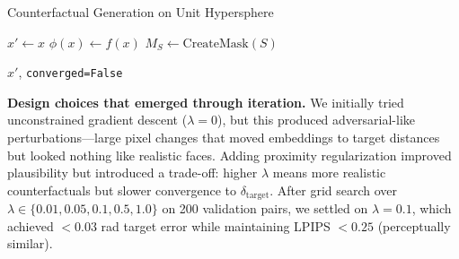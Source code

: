\begin{algorithm}[t]
\caption{Counterfactual Generation on Unit Hypersphere}
\label{alg:counterfactual}

$x' \leftarrow x$ 
$\phi(x) \leftarrow f(x)$ 
$M_S \leftarrow \text{CreateMask}(S)$ 


\Return $x'$, \texttt{converged=False} 
\end{algorithm}

\textbf{Design choices that emerged through iteration.} We initially tried unconstrained gradient descent ($\lambda = 0$), but this produced adversarial-like perturbations—large pixel changes that moved embeddings to target distances but looked nothing like realistic faces. Adding proximity regularization improved plausibility but introduced a trade-off: higher $\lambda$ means more realistic counterfactuals but slower convergence to $\delta_{\text{target}}$. After grid search over $\lambda \in \{0.01, 0.05, 0.1, 0.5, 1.0\}$ on 200 validation pairs, we settled on $\lambda = 0.1$, which achieved $<0.03$ rad target error while maintaining LPIPS $< 0.25$ (perceptually similar).

